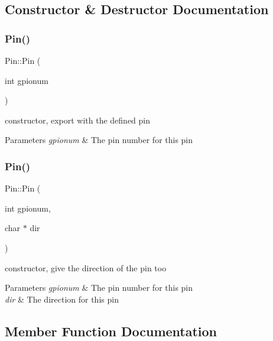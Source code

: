 \subsection{Constructor \& Destructor Documentation}
\mbox{\label{classPin_a580d21a6d49bf1276146b0fab1a6039e}} 
\subsubsection{\texorpdfstring{Pin()}{Pin()}\hspace{0.1cm}{\footnotesize\ttfamily [1/2]}}
{\footnotesize\ttfamily Pin\+::\+Pin (\begin{DoxyParamCaption}\item[{int}]{gpionum }\end{DoxyParamCaption})}



constructor, export with the defined pin 


\begin{DoxyParams}{Parameters}
{\em gpionum} & The pin number for this pin \\
\hline
\end{DoxyParams}
\mbox{\label{classPin_ae09bd2322f5ebbfaf98a379566d88ac0}} 
\subsubsection{\texorpdfstring{Pin()}{Pin()}\hspace{0.1cm}{\footnotesize\ttfamily [2/2]}}
{\footnotesize\ttfamily Pin\+::\+Pin (\begin{DoxyParamCaption}\item[{int}]{gpionum,  }\item[{char $\ast$}]{dir }\end{DoxyParamCaption})}



constructor, give the direction of the pin too 


\begin{DoxyParams}{Parameters}
{\em gpionum} & The pin number for this pin \\
\hline
{\em dir} & The direction for this pin \\
\hline
\end{DoxyParams}


\subsection{Member Function Documentation}
\mbox{\label{classPin_a233ab381d3ebab706ca96bc3b78f0927}} 
